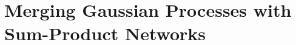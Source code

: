\documentclass[10pt,letterpaper]{article}
\newcommand{\X}{\mathbf{X}}
\newcommand{\x}{\mathbf{x}}
\newcommand{\y}{\mathbf{y}}
\newcommand{\xn}{\mathbf{x}_{n}}
\newcommand{\new}{_{*}}
\theoremstyle{mystyle}
\begin{document}
\section{Merging Gaussian Processes with Sum-Product Networks}
%
\end{document}
